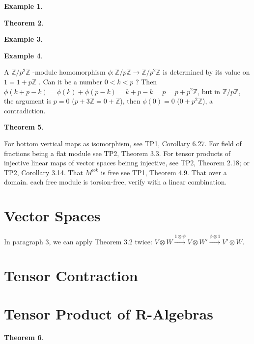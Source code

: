 \documentclass{article}
\newtheorem{theorem}{Theorem}[section]
\newtheorem{example}[theorem]{Example}
\begin{document}
\begin{example}
\end{example}

\begin{theorem}
\end{theorem}

\begin{example}
\end{example}

\begin{example}
\end{example}
A $ \mathbb{Z} / p^2 \mathbb{Z} $ -module homomorphism $ \phi: \mathbb{Z} / p\mathbb{Z} \rightarrow \mathbb{Z} / p^2 \mathbb{Z}$ is determined by its value on $1 = 1 + p \mathbb{Z}$ . Can it be a number $ 0 < k < p $ ? Then $ \phi(k + p - k) = \phi(k) + \phi(p - k) = k + p - k = p = p + p^2 \mathbb{Z} $, but in $\mathbb{Z}/p\mathbb{Z}$, the argument is $p = 0$ ($p + 3\mathbb{Z} = 0 + \mathbb{Z}$), then $\phi(0) = 0$ ($0 + p^2\mathbb{Z}$), a contradiction.

\begin{theorem}
\end{theorem}
For bottom vertical maps as isomorphism, see TP1, Corollary 6.27.
For field of fractions being a flat module see TP2, Theorem 3.3.
For tensor products of injective linear maps of vector spaces beinng injective, see TP2, Theorem 2.18; or TP2, Corollary 3.14. That $ M^{\otimes k} $ is free see TP1, Theorem 4.9. That over a domain. each free module is torsion-free, verify with a linear combination.

\section{Vector Spaces}

In paragraph 3, we can apply Theorem 3.2 twice: $ V \otimes W \xrightarrow{1 \otimes \psi} V \otimes W'\xrightarrow{\phi \otimes 1} V' \otimes W $.

\section{Tensor Contraction}

\section{Tensor Product of R-Algebras}

\begin{theorem}
\end{theorem}
\end{document}
